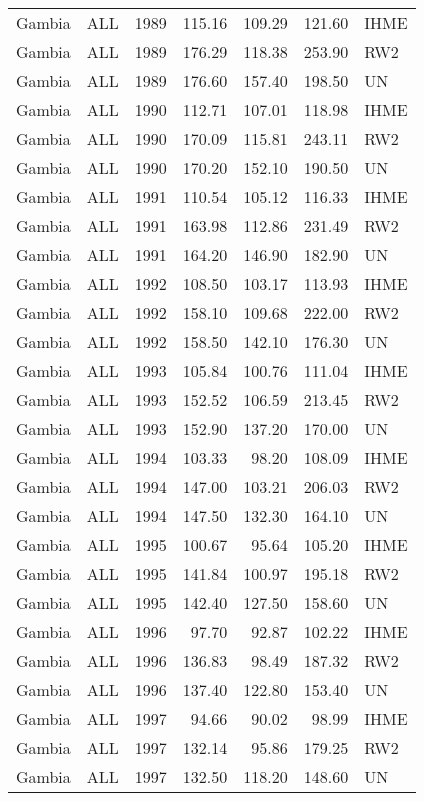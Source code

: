 \begin{longtable}{lllrrrl}
  Gambia & ALL & 1989 & 115.16 & 109.29 & 121.60 & IHME \\ 
  Gambia & ALL & 1989 & 176.29 & 118.38 & 253.90 & RW2 \\ 
  Gambia & ALL & 1989 & 176.60 & 157.40 & 198.50 & UN \\ 
  Gambia & ALL & 1990 & 112.71 & 107.01 & 118.98 & IHME \\ 
  Gambia & ALL & 1990 & 170.09 & 115.81 & 243.11 & RW2 \\ 
  Gambia & ALL & 1990 & 170.20 & 152.10 & 190.50 & UN \\ 
  Gambia & ALL & 1991 & 110.54 & 105.12 & 116.33 & IHME \\ 
  Gambia & ALL & 1991 & 163.98 & 112.86 & 231.49 & RW2 \\ 
  Gambia & ALL & 1991 & 164.20 & 146.90 & 182.90 & UN \\ 
  Gambia & ALL & 1992 & 108.50 & 103.17 & 113.93 & IHME \\ 
  Gambia & ALL & 1992 & 158.10 & 109.68 & 222.00 & RW2 \\ 
  Gambia & ALL & 1992 & 158.50 & 142.10 & 176.30 & UN \\ 
  Gambia & ALL & 1993 & 105.84 & 100.76 & 111.04 & IHME \\ 
  Gambia & ALL & 1993 & 152.52 & 106.59 & 213.45 & RW2 \\ 
  Gambia & ALL & 1993 & 152.90 & 137.20 & 170.00 & UN \\ 
  Gambia & ALL & 1994 & 103.33 & 98.20 & 108.09 & IHME \\ 
  Gambia & ALL & 1994 & 147.00 & 103.21 & 206.03 & RW2 \\ 
  Gambia & ALL & 1994 & 147.50 & 132.30 & 164.10 & UN \\ 
  Gambia & ALL & 1995 & 100.67 & 95.64 & 105.20 & IHME \\ 
  Gambia & ALL & 1995 & 141.84 & 100.97 & 195.18 & RW2 \\ 
  Gambia & ALL & 1995 & 142.40 & 127.50 & 158.60 & UN \\ 
  Gambia & ALL & 1996 & 97.70 & 92.87 & 102.22 & IHME \\ 
  Gambia & ALL & 1996 & 136.83 & 98.49 & 187.32 & RW2 \\ 
  Gambia & ALL & 1996 & 137.40 & 122.80 & 153.40 & UN \\ 
  Gambia & ALL & 1997 & 94.66 & 90.02 & 98.99 & IHME \\ 
  Gambia & ALL & 1997 & 132.14 & 95.86 & 179.25 & RW2 \\ 
  Gambia & ALL & 1997 & 132.50 & 118.20 & 148.60 & UN \\ 

\end{longtable}
